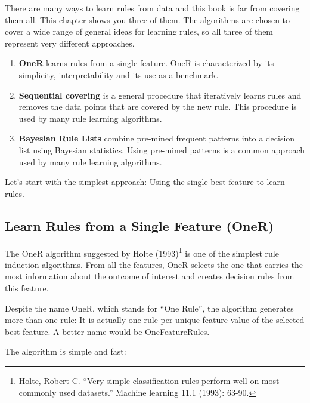 \documentclass[
  11pt,
]{scrbook}
\providecommand{\tightlist}{%
  \setlength{\itemsep}{0pt}\setlength{\parskip}{0pt}}
\begin{document}
There are many ways to learn rules from data and this book is far from covering them all.
This chapter shows you three of them.
The algorithms are chosen to cover a wide range of general ideas for learning rules, so all three of them represent very different approaches.

\begin{enumerate}
\def\labelenumi{\arabic{enumi}.}
\tightlist
\item
  \textbf{OneR} learns rules from a single feature.
  OneR is characterized by its simplicity, interpretability and its use as a benchmark.
\item
  \textbf{Sequential covering} is a general procedure that iteratively learns rules and removes the data points that are covered by the new rule.
  This procedure is used by many rule learning algorithms.
\item
  \textbf{Bayesian Rule Lists} combine pre-mined frequent patterns into a decision list using Bayesian statistics.
  Using pre-mined patterns is a common approach used by many rule learning algorithms.
\end{enumerate}

Let's start with the simplest approach: Using the single best feature to learn rules.

\hypertarget{learn-rules-from-a-single-feature-oner}{%
\subsection{Learn Rules from a Single Feature (OneR)}\label{learn-rules-from-a-single-feature-oner}}

The OneR algorithm suggested by Holte (1993)\footnote{Holte, Robert C. ``Very simple classification rules perform well on most commonly used datasets.'' Machine learning 11.1 (1993): 63-90.} is one of the simplest rule induction algorithms.
From all the features, OneR selects the one that carries the most information about the outcome of interest and creates decision rules from this feature.

Despite the name OneR, which stands for ``One Rule'', the algorithm generates more than one rule:
It is actually one rule per unique feature value of the selected best feature.
A better name would be OneFeatureRules.

The algorithm is simple and fast:
\end{document}
